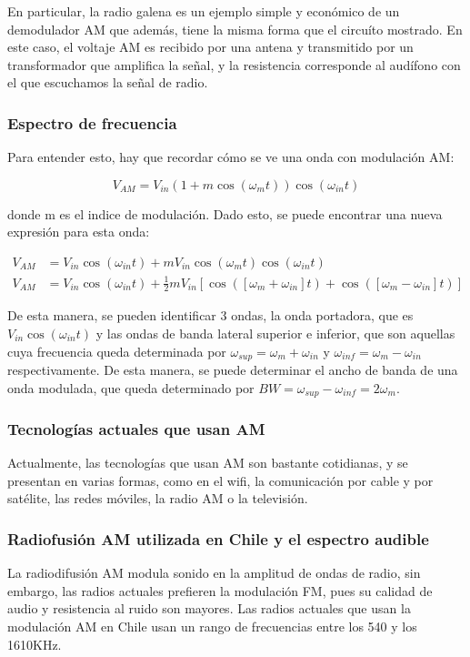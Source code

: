En particular, la radio galena es un ejemplo simple y económico de un demodulador AM que además, tiene la misma forma que el circuíto mostrado. En este caso, el voltaje AM es recibido por una antena y transmitido por un transformador que amplifica la señal, y la resistencia corresponde al audífono con el que escuchamos la señal de radio.

\subsubsection{Espectro de frecuencia}

Para entender esto, hay que recordar cómo se ve una onda con modulación AM:

\begin{equation*}
    V_{AM}=V_{in}(1+m\cos(\omega_mt))\cos(\omega_{in}t)
\end{equation*}

donde m es el indice de modulación. Dado esto, se puede encontrar una nueva expresión para esta onda:

\begin{align*}
    V_{AM} & =V_{in}\cos(\omega_{in}t)+mV_{in}\cos(\omega_mt)\cos(\omega_{in}t)                                        \\
    V_{AM} & =V_{in}\cos(\omega_{in}t)+\frac{1}{2}mV_{in}[\cos([\omega_m+\omega_{in}]t)+\cos([\omega_m-\omega_{in}]t)]
\end{align*}

De esta manera, se pueden identificar 3 ondas, la onda portadora, que es $V_{in}\cos(\omega_{in}t)$ y las ondas de banda lateral superior e inferior, que son aquellas cuya frecuencia queda determinada por $\omega_{sup}=\omega_m+\omega_{in}$ y $\omega_{inf}=\omega_m - \omega_{in}$ respectivamente. De esta manera, se puede determinar el ancho de banda de una onda modulada, que queda determinado por $BW = \omega_{sup}-\omega_{inf} = 2\omega_m$.

\subsubsection{Tecnologías actuales que usan AM}

Actualmente, las tecnologías que usan AM son bastante cotidianas, y se presentan en varias formas, como en el wifi, la comunicación por cable y por satélite, las redes móviles, la radio AM o la televisión.

\subsubsection{Radiofusión AM utilizada en Chile y el espectro audible}

La radiodifusión AM modula sonido en la amplitud de ondas de radio, sin embargo, las radios actuales prefieren la modulación FM, pues su calidad de audio y resistencia al ruido son mayores. Las radios actuales que usan la modulación AM en Chile usan un rango de frecuencias entre los 540 y los 1610KHz.